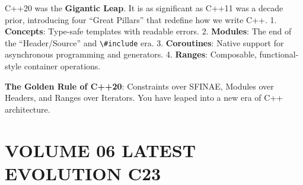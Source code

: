 C++20 was the \textbf{Gigantic Leap}. It is as significant as C++11 was
a decade prior, introducing four ``Great Pillars'' that redefine how we
write C++. 1. \textbf{Concepts}: Type-safe templates with readable
errors. 2. \textbf{Modules}: The end of the ``Header/Source'' and
\passthrough{\lstinline!\#include!} era. 3. \textbf{Coroutines}: Native
support for asynchronous programming and generators. 4. \textbf{Ranges}:
Composable, functional-style container operations.

\textbf{The Golden Rule of C++20}: Constraints over SFINAE, Modules over
Headers, and Ranges over Iterators. You have leaped into a new era of
C++ architecture.

\hypertarget{volume-06-latest-evolution-c23}{%
\section{VOLUME 06 LATEST EVOLUTION
C23}\label{volume-06-latest-evolution-c23}}
